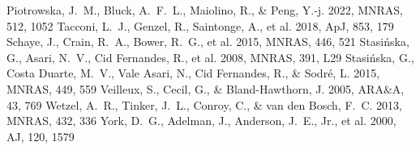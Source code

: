 \documentclass[twocolumn]{aastex631}
\begin{document}
\begin{thebibliography}{}
 Piotrowska, J.~M., Bluck, A.~F.~L., Maiolino, R., \& Peng, Y.-j. 2022, MNRAS, 512, 1052
 Tacconi, L.~J., Genzel, R., Saintonge, A., et al. 2018, ApJ, 853, 179
 Schaye, J., Crain, R.~A., Bower, R.~G., et al. 2015, MNRAS, 446, 521
 Stasi{\'n}ska, G., Asari, N.~V., Cid Fernandes, R., et al. 2008, MNRAS, 391, L29
 Stasi{\'n}ska, G., Costa Duarte, M.~V., Vale Asari, N., Cid Fernandes, R., \& Sodr{\'e}, L. 2015, MNRAS, 449, 559
 Veilleux, S., Cecil, G., \& Bland-Hawthorn, J. 2005, ARA\&A, 43, 769
 Wetzel, A.~R., Tinker, J.~L., Conroy, C., \& van den Bosch, F.~C. 2013, MNRAS, 432, 336
 York, D.~G., Adelman, J., Anderson, J.~E., Jr., et al. 2000, AJ, 120, 1579
\end{thebibliography}
\end{document}
